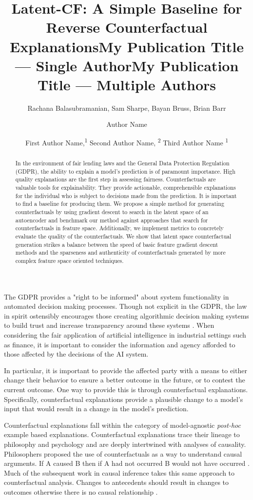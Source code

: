 \documentclass[letterpaper]{article} %
\title{Latent-CF: A Simple Baseline for Reverse Counterfactual Explanations}
\author{
    Rachana Balasubramanian, Sam Sharpe, Bayan Bruss, Brian Barr\\}
\title{My Publication Title --- Single Author}
\author {
    Author Name \\
}
\title{My Publication Title --- Multiple Authors}
\author {
    First Author Name,\textsuperscript{\rm 1}
    Second Author Name, \textsuperscript{\rm 2}
    Third Author Name \textsuperscript{\rm 1} \\
}
\begin{document}
\maketitle

\begin{abstract}
In the environment of fair lending laws and the General Data Protection Regulation (GDPR), the ability to explain a model's prediction is of paramount importance. High quality explanations are the first step in assessing fairness.  Counterfactuals are valuable tools for explainability.  They provide actionable, comprehensible explanations for the individual who is subject to decisions made from the prediction. It is important to find a baseline for producing them. We propose a simple method for generating counterfactuals by using gradient descent to search in the latent space of an autoencoder and benchmark our method against approaches that search for counterfactuals in feature space. Additionally, we implement metrics to concretely evaluate the quality of the counterfactuals.  We show that latent space counterfactual generation strikes a balance between the speed of basic feature gradient descent methods and the sparseness and authenticity of counterfactuals generated by more complex feature space oriented techniques. 
\end{abstract}

\noindent The GDPR provides a "right to be informed" about system functionality in automated decision making processes. Though not explicit in the GDPR, the law in spirit ostensibly encourages those creating algorithmic decision making systems to build trust and increase transparency around these systems \citep{wachter2017counterfactual}. When considering the fair application of artificial intelligence in industrial settings such as finance, it is important to consider the information and agency afforded to those affected by the decisions of the AI system.  

In particular, it is important to provide the affected party with a means to either change their behavior to ensure a better outcome in the future, or to contest the current outcome. One way to provide this is through counterfactual explanations. Specifically, counterfactual explanations provide a plausible change to a model's input that would result in a change in the model's prediction.


Counterfactual explanations fall within the category of model-agnostic \textit{post-hoc} example based explanations. Counterfactual explanations trace their lineage to philosophy and psychology and are deeply intertwined with analyses of causality. Philosophers proposed the use of counterfactuals as a way to understand causal arguments. If A caused B then if A had not occurred B would not have occurred \cite{lewis1973}. Much of the subsequent work in causal inference takes this same approach to counterfactual analysis. Changes to antecedents should result in changes to outcomes otherwise there is no causal relationship \cite{pearl2011algorithmization}. 
\end{document}
